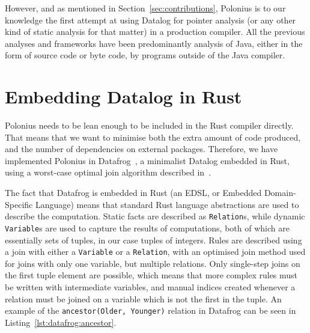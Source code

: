\documentclass[11pt,a4paper,twoside,openany]{report}
\newcommand{\InRust}[1]{\texttt{#1}}
\newcommand{\InDatalog}[1]{\texttt{#1}}
\renewcommand\_{\textunderscore\allowbreak}
\begin{document}
However, and as mentioned in Section~\ref{sec:contributions}, Polonius is to our
knowledge the first attempt at using Datalog for pointer analysis (or any other
kind of static analysis for that matter) in a production compiler. All the
previous analyses and frameworks have been predominantly analysis of Java,
either in the form of source code or byte code, by programs outside of the Java
compiler.

\section{Embedding Datalog in Rust}\label{sec:datafrog}

Polonius needs to be lean enough to be included in the Rust compiler directly.
That means that we want to minimise both the extra amount of code produced, and
the number of dependencies on external packages. Therefore, we have implemented
Polonius in Datafrog~\cite{datafrog}, a minimalist Datalog embedded in Rust,
using a worst-case optimal join algorithm described
in~\cite{ngo_worst-case_2012}.

The fact that Datafrog is embedded in Rust (an EDSL, or Embedded Domain-Specific
Language) means that standard Rust language abstractions are used to describe
the computation. Static facts are described as \InRust{Relation}s, while dynamic
\InRust{Variable}s are used to capture the results of computations, both of
which are essentially sets of tuples, in our case tuples of integers. Rules are
described using a join with either a \InRust{Variable} or a \InRust{Relation},
with an optimised join method used for joins with only one variable, but
multiple relations. Only single-step joins on the first tuple element are
possible, which means that more complex rules must be written with intermediate
variables, and manual indices created whenever a relation must be joined on a
variable which is not the first in the tuple. An example of the
\InDatalog{ancestor(Older, Younger)} relation in Datafrog can be seen in
Listing~\ref{lst:datafrog:ancestor}.
\end{document}
